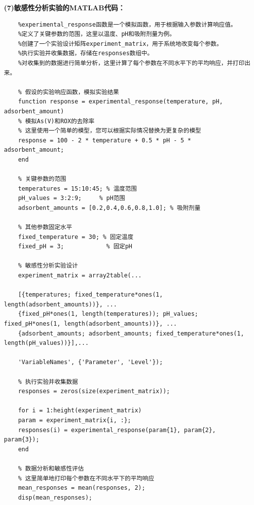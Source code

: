 \documentclass[AutoFakeBold]{ctexart}
\begin{document}
 \centering\textbf{(7)敏感性分析实验的MATLAB代码：}
 \lstset{language=MATLAB}
 \lstset{breaklines}%
 \begin{lstlisting}
 	%experimental_response函数是一个模拟函数，用于根据输入参数计算响应值。
 	%定义了关键参数的范围，这里以温度、pH和吸附剂量为例。
 	%创建了一个实验设计矩阵experiment_matrix，用于系统地改变每个参数。
 	%执行实验并收集数据，存储在responses数组中。
 	%对收集到的数据进行简单分析，这里计算了每个参数在不同水平下的平均响应，并打印出来。
 	
 	% 假设的实验响应函数，模拟实验结果
 	function response = experimental_response(temperature, pH, adsorbent_amount)
 	% 模拟As(V)和ROX的去除率
 	% 这里使用一个简单的模型，您可以根据实际情况替换为更复杂的模型
 	response = 100 - 2 * temperature + 0.5 * pH - 5 * adsorbent_amount;
 	end
 	
 	% 关键参数的范围
 	temperatures = 15:10:45; % 温度范围
 	pH_values = 3:2:9;     % pH范围
 	adsorbent_amounts = [0.2,0.4,0.6,0.8,1.0]; % 吸附剂量
 	
 	% 其他参数固定水平
 	fixed_temperature = 30; % 固定温度
 	fixed_pH = 3;            % 固定pH
 	
 	% 敏感性分析实验设计
 	experiment_matrix = array2table(...
 	
 	[{temperatures; fixed_temperature*ones(1, length(adsorbent_amounts))}, ...
 	{fixed_pH*ones(1, length(temperatures)); pH_values; fixed_pH*ones(1, length(adsorbent_amounts))}, ...
 	{adsorbent_amounts; adsorbent_amounts; fixed_temperature*ones(1, length(pH_values))}],...
 	
 	'VariableNames', {'Parameter', 'Level'});
 	
 	% 执行实验并收集数据
 	responses = zeros(size(experiment_matrix));
 	
 	for i = 1:height(experiment_matrix)
 	param = experiment_matrix{i, :};
 	responses(i) = experimental_response(param{1}, param{2}, param{3});
 	end
 	
 	% 数据分析和敏感性评估
 	% 这里简单地打印每个参数在不同水平下的平均响应
 	mean_responses = mean(responses, 2);
 	disp(mean_responses);
 	
 \end{lstlisting}
 
\end{document}
